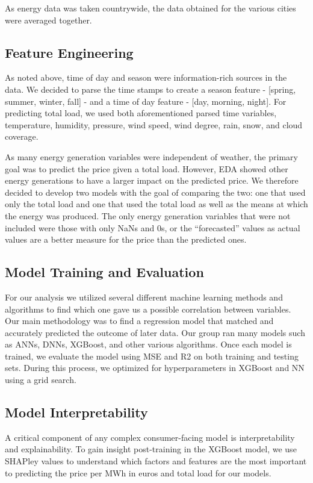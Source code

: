 \documentclass[10pt]{article}
\begin{document}
As energy data was taken countrywide, the data obtained for the various cities were averaged together. 

\subsection{Feature Engineering}
As noted above, time of day and season were information-rich sources in the data. We decided to parse the time stamps to create a season feature - [spring, summer, winter, fall] - and a time of day feature - [day, morning, night]. For predicting total load, we used both aforementioned parsed time variables, temperature, humidity, pressure, wind speed, wind degree, rain, snow, and cloud coverage. 

As many energy generation variables were independent of weather, the primary goal was to predict the price given a total load. However, EDA showed other energy generations to have a larger impact on the predicted price. We therefore decided to develop two models with the goal of comparing the two: one that used only the total load and one that used the total load as well as the means at which the energy was produced. The only energy generation variables that were not included were those with only NaNs and 0s, or the “forecasted” values as actual values are a better measure for the price than the predicted ones.

\subsection{Model Training and Evaluation}
For our analysis we utilized several different machine learning methods and algorithms to find which one gave us a possible correlation between variables. Our main methodology was to find a regression model that matched and accurately predicted the outcome of later data. Our group ran many models such as ANNs, DNNs, XGBoost, and other various algorithms. Once each model is trained, we evaluate the model using MSE and R2 on both training and testing sets. During this process, we optimized for hyperparameters in XGBoost and NN using a grid search.

\subsection{Model Interpretability}
A critical component of any complex consumer-facing model is interpretability and explainability. To gain insight post-training in the XGBoost model, we use SHAPley values to understand which factors and features are the most important to predicting the price per MWh in euros and total load for our models.
\end{document}
